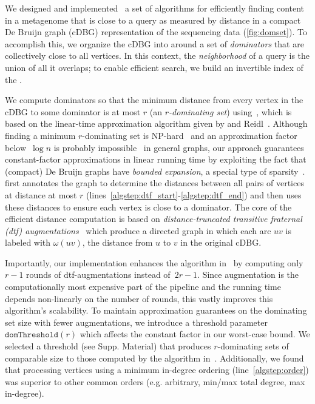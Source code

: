 We designed and implemented~\cite{spacegraphcats} a set of algorithms for efficiently
finding content in a metagenome that is close to a query as measured
by distance in a compact De Bruijn graph (cDBG) representation of the
sequencing data (\autoref{fig:domset}). To accomplish this, we organize the cDBG into {\em \pieces}
around a set of \emph{dominators} that are collectively close to all vertices. In this
context, the {\em neighborhood} of a query is the union of all \pieces it overlaps;
to enable efficient search, we build an invertible index of the \pieces.

We compute dominators so that the minimum distance from every vertex
in the cDBG to some dominator is at most $r$ (an \emph{$r$-dominating set})
using~, which is based on the linear-time approximation algorithm
given by \Dvorak and Reidl~\cite{felixThesis}. Although finding a minimum $r$-dominating set is
NP-hard~\cite{karp1972reducibility,chlebik2008approximation,downey2012parameterized} and
an approximation factor below~$\log n$ is probably impossible~\cite{chlebik2008approximation}
in general graphs, our approach guarantees constant-factor approximations
in linear running time by exploiting the fact that
(compact) De Bruijn graphs have \emph{bounded expansion}, a special type of
sparsity~\cite{sparsity}.  first
annotates the graph to determine the distances between all pairs of vertices at
distance at most $r$ (lines~\ref{algstep:dtf_start}-\ref{algstep:dtf_end}) and
then uses these distances to ensure each vertex is close to a dominator.
The core of the efficient distance computation is based on
\emph{distance-truncated transitive fraternal (dtf) augmentations}~\cite{felixThesis}
which produce a directed graph in which each arc $uv$ is labeled with
$\omega(uv)$, the distance from $u$ to $v$ in the original cDBG.

Importantly, our implementation enhances the algorithm
in~\cite{felixThesis} by computing only $r{-}1$ rounds of dtf-augmentations
instead of~$2r{-}1$. Since augmentation is the computationally most
expensive part of the pipeline and the running time depends non-linearly on
the number of rounds, this vastly improves this algorithm's scalability.
To maintain approximation guarantees on the dominating set size with fewer augmentations,
we introduce a threshold parameter $\texttt{domThreshold}(r)$
which affects the constant factor in our worst-case bound.
We selected a threshold (see Supp. Material) that produces $r$-dominating sets of
comparable size to those computed by the algorithm in~\cite{felixThesis}. Additionally,
we found that processing vertices using a minimum in-degree ordering (line~\ref{algstep:order})
was superior to other common orders (e.g. arbitrary, min/max total degree, max in-degree).


